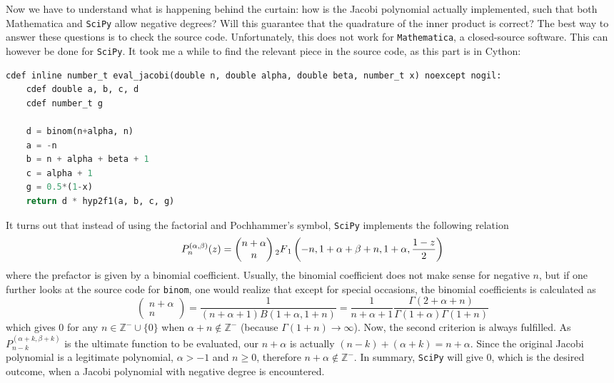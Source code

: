 Now we have to understand what is happening behind the curtain: how is the Jacobi polynomial actually implemented, such that both Mathematica and \texttt{SciPy} allow negative degrees?
Will this guarantee that the quadrature of the inner product is correct?
The best way to answer these questions is to check the source code.
Unfortunately, this does not work for \texttt{Mathematica}, a closed-source software.
This can however be done for \texttt{SciPy}.
It took me a while to find the relevant piece in the source code, as this part is in Cython:
\begin{lstlisting}[language=Python]
cdef inline number_t eval_jacobi(double n, double alpha, double beta, number_t x) noexcept nogil:
    cdef double a, b, c, d
    cdef number_t g

    d = binom(n+alpha, n)
    a = -n
    b = n + alpha + beta + 1
    c = alpha + 1
    g = 0.5*(1-x)
    return d * hyp2f1(a, b, c, g)
\end{lstlisting}
It turns out that instead of using the factorial and Pochhammer's symbol, \texttt{SciPy} implements the following relation
\[
    P_n^{(\alpha,\beta)}(z) = \begin{pmatrix}n+\alpha \\ n\end{pmatrix}\prescript{}{2}{F}_1\left(-n, 1+\alpha+\beta+n, 1+\alpha, \frac{1-z}{2}\right)
\]
where the prefactor is given by a binomial coefficient. Usually, the binomial coefficient does not make sense for negative $n$, but if one further looks at the source code for \texttt{binom}, one would realize that except for special occasions, the binomial coefficients is calculated as
\[
    \begin{pmatrix} n + \alpha \\ n \end{pmatrix} = \frac{1}{(n + \alpha + 1)B(1 + \alpha, 1 + n)} = \frac{1}{n + \alpha + 1} \frac{\Gamma(2 + \alpha + n)}{\Gamma(1 + \alpha) \Gamma(1 + n)}
\]
which gives $0$ for any $n\in \mathbb{Z}^- \cup \{0\}$ when $\alpha + n \notin \mathbb{Z}^-$ (because $\Gamma(1+n)\rightarrow \infty$). Now, the second criterion is always fulfilled. As $P_{n-k}^{(\alpha + k, \beta + k)}$ is the ultimate function to be evaluated, our $n+\alpha$ is actually $(n-k)+(\alpha +k) = n+\alpha$. Since the original Jacobi polynomial is a legitimate polynomial, $\alpha > -1$ and $n\geq 0$, therefore $n+\alpha \notin \mathbb{Z}^-$. In summary, \texttt{SciPy} will give $0$, which is the desired outcome, when a Jacobi polynomial with negative degree is encountered.

